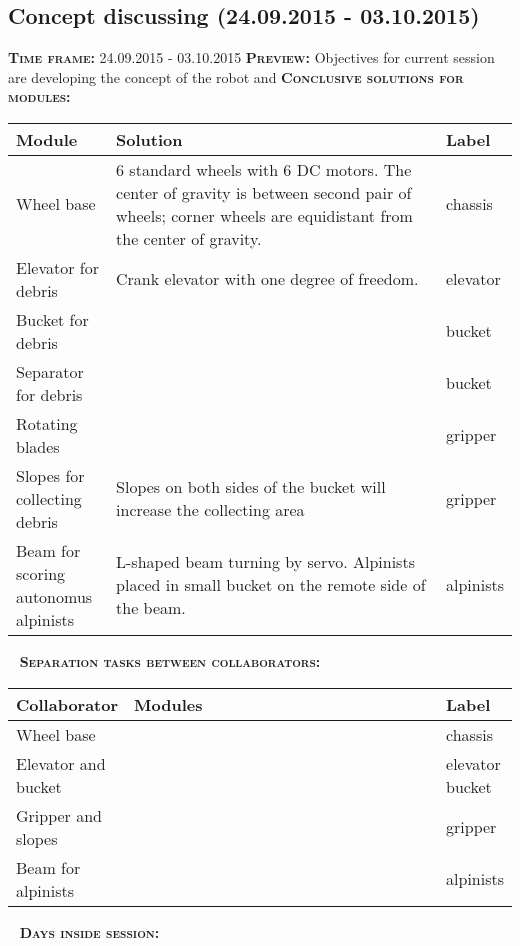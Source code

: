 \subsection{Concept discussing (24.09.2015 - 03.10.2015)}
	\textsc{\textbf{Time frame:}} 24.09.2015 - 03.10.2015 \newline
	\textsc{\textbf{Preview:}} Objectives for current session are developing the concept of the robot and  \newline \newline
	\textsc{\textbf{Conclusive solutions for modules:}}
	
	\begin{table}[H]
		\vspace{-2mm}
		\begin{center}
			\begin{tabular}{|p{0.2\linewidth}|p{0.7\linewidth}|p{0.1\linewidth}|}
				\hline
				Module & Solution & Label \\
				\hline
				Wheel base & 6 standard wheels with 6 DC motors. The center of gravity is between second pair of wheels; corner wheels are equidistant from the center of gravity. & chassis \\
				\hline
				Elevator for debris & Crank elevator with one degree of freedom. & elevator \\
				\hline
				Bucket for debris &  & bucket \\
				\hline
				Separator for debris &  & bucket \\
				\hline
				Rotating blades &  & gripper \\
				\hline
				Slopes for collecting debris & Slopes on both sides of the bucket will increase the collecting area & gripper \\
				\hline
				Beam for scoring autonomus alpinists & L-shaped beam turning by servo. Alpinists placed in small bucket on the remote side of the beam. & alpinists \\
				\hline
			\end{tabular}
		\end{center}
	\end{table}
	\vspace{-10mm}
	 \newline
	\textsc{\textbf{Separation tasks between collaborators:}}
	
	\begin{table}[H]
		\vspace{-2mm}
		\begin{center}
			\begin{tabular}{|p{0.2\linewidth}|p{0.7\linewidth}|p{0.1\linewidth}|}
				\hline
				Collaborator & Modules & Label \\
				\hline
				Wheel base &  & chassis \\
				\hline
				Elevator and bucket &  & elevator bucket \\
				\hline
				Gripper and slopes &  & gripper \\
				\hline
				Beam for alpinists &  & alpinists \\
				\hline
			\end{tabular}
		\end{center}
	\end{table}
  
   \newline
  \textsc{\textbf{Days inside session:}}
  
  
  
  
  
